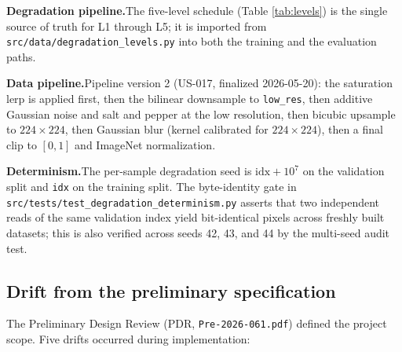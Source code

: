 \textbf{Degradation pipeline.}\quad The five-level schedule (Table
\ref{tab:levels}) is the single source of truth for L1 through L5; it is
imported from \texttt{src/data/degradation\_levels.py} into both the training
and the evaluation paths.



\textbf{Data pipeline.}\quad Pipeline version 2 (US-017, finalized
2026-05-20): the saturation lerp is applied first, then the bilinear
downsample to \texttt{low\_res}, then additive Gaussian noise and salt and
pepper at the low resolution, then bicubic upsample to $224 \times 224$,
then Gaussian blur (kernel calibrated for $224 \times 224$), then a final
clip to $[0, 1]$ and ImageNet normalization.

\textbf{Determinism.}\quad The per-sample degradation seed is
$\text{idx} + 10^7$ on the validation split and \texttt{idx} on the training
split. The byte-identity gate in
\texttt{src/tests/test\_degradation\_determinism.py} asserts that two
independent reads of the same validation index yield bit-identical pixels
across freshly built datasets; this is also verified across seeds 42, 43,
and 44 by the multi-seed audit test.

\subsection{Drift from the preliminary specification}

The Preliminary Design Review (PDR, \texttt{Pre-2026-061.pdf}) defined the
project scope. Five drifts occurred during implementation:

